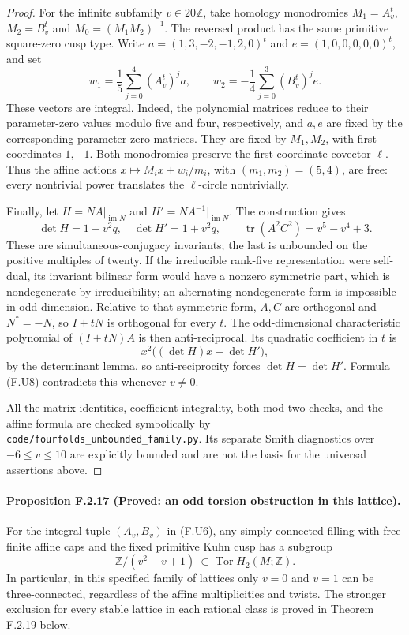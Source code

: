 \begin{proof}
For the infinite subfamily $v\in20\mathbb Z$, take homology
monodromies $M_1=A_v^t$, $M_2=B_v^t$ and
$M_0=(M_1M_2)^{-1}$.  The reversed product has the same
primitive square-zero cusp type.  Write
$a=(1,3,-2,-1,2,0)^t$ and $e=(1,0,0,0,0,0)^t$, and set
\[
 w_1=\frac15\sum_{j=0}^4(A_v^t)^j a,
 \qquad
 w_2=-\frac14\sum_{j=0}^3(B_v^t)^j e.
 \tag{F.U7}
\]
These vectors are integral.  Indeed, the polynomial matrices
reduce to their parameter-zero values modulo five and four,
respectively, and $a,e$ are fixed by the corresponding
parameter-zero matrices.  They are fixed by $M_1,M_2$, with
first coordinates $1,-1$.  Both monodromies preserve the
first-coordinate covector $\ell$.  Thus the affine actions
$x\mapsto M_i x+w_i/m_i$, with $(m_1,m_2)=(5,4)$, are free:
every nontrivial power translates the $\ell$-circle nontrivially.

Finally, let $H=NA|_{\operatorname{im}N}$ and
$H'=NA^{-1}|_{\operatorname{im}N}$.  The construction gives
\[
 \det H=1-v^2q,\quad \det H'=1+v^2q,
 \qquad\operatorname{tr}(A^2C^2)=v^5-v^4+3.
 \tag{F.U8}
\]
These are simultaneous-conjugacy invariants; the last is
unbounded on the positive multiples of twenty.  If the
irreducible rank-five representation were self-dual, its
invariant bilinear form would have a nonzero symmetric part,
which is nondegenerate by irreducibility; an alternating
nondegenerate form is impossible in odd dimension.  Relative
to that symmetric form, $A,C$ are orthogonal and
$N^*=-N$, so $I+tN$ is orthogonal for every $t$.
The odd-dimensional characteristic polynomial of $(I+tN)A$
is then anti-reciprocal.  Its quadratic coefficient in $t$ is
\[
 x^2\bigl((\det H)x-\det H'\bigr),
\]
by the determinant lemma, so anti-reciprocity forces
$\det H=\det H'$.  Formula (F.U8) contradicts this whenever
$v\ne0$.

All the matrix identities, coefficient integrality, both
mod-two checks, and the affine formula are checked symbolically
by \texttt{code/fourfolds\_unbounded\_family.py}.  Its separate
Smith diagnostics over $-6\le v\le10$ are explicitly bounded
and are not the basis for the universal assertions above.
\end{proof}

\paragraph{Proposition F.2.17 (Proved: an odd torsion obstruction in this lattice).}
For the integral tuple $(A_v,B_v)$ in (F.U6), any simply
connected filling with free finite affine caps and the fixed
primitive Kuhn cusp has a subgroup
\[
 \mathbb Z/(v^2-v+1)\ \subset\operatorname{Tor}H_2(M;\mathbb Z).
 \tag{F.U9}
\]
In particular, in this specified family of lattices only
$v=0$ and $v=1$ can be three-connected, regardless of the
affine multiplicities and twists.  The stronger exclusion for every stable lattice in each
rational class is proved in Theorem F.2.19 below.

